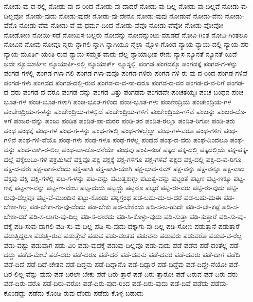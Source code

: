 {ನೋಡು-ವು-ದ-ರಲ್ಲಿ
ನೋಡು-ವು-ದ-ರಿಂದ
ನೋಡು-ವು-ದಾದರೆ
ನೋಡು-ವು-ದಿಲ್ಲ
ನೋಡು-ವು-ದಿಲ್ಲವೆ
ನೋಡು-ವು-ದಿಲ್ಲವೋ
ನೋಡು-ವುದು
ನೋಡು-ವುದೇ
ನೋಡು-ವು-ದೇನೊ
ನೋಡು-ವುವು
ನೋಡುವೆ
ನೋಡು-ವೆನು
ನೋಡು-ವೆನೊ
ನೋಡು-ವೆವು
ನೋಡು-ವೆ-ವು-ಧರ್ಮ-ದಿಂದ
ನೋಡು-ವೆವೊ
ನೋಡು-ವೆವೋ
ನೋಡು-ವೋವೋ
ನೋಡೋಣ
ನೋಯಿ-ಸದೆ
ನೋಯಿಸ-ಬಲ್ಲರು
ನೋವನ್ನು
ನೋವನ್ನುಂಟು-ಮಾಡದೆ
ನೋವಿ-ಗಿಂತ
ನೋವಿ-ಗಿಂತಲೂ
ನೋವಿನ
ನೋವು
ನೋವೂ
ನ್ನರು
ನ್ನಾಗಲಿ
ನ್ನಾಗಿ
ನ್ನಾಗಿಯೂ
ನ್ನೆಲ್ಲಾ
ನ್ನೊಳ-ಗೊಂಡ
ನ್ಯಾಯ
ನ್ಯಾಯ-ದಲ್ಲಿ
ನ್ಯಾಯ-ಪರ
ನ್ಯಾಯ-ಮೂರ್ತಿ-ಯಂತಿ-ರುವ
ನ್ಯಾಯ-ಸಮ್ಮತ-ವಾದು-ದೆಲ್ಲ
ನ್ಯಾಯಾಧೀಶ-ರೇನು
ನ್ಯಾಸ
ನ್ಯೂನತೆ
ನ್ಯೂನತೆ-ಯಿದೆ-ಅದೇ
ನ್ಯೂಯಾರ್ಕಿನ
ನ್ಯೂಯಾರ್ಕಿ-ನಲ್ಲಿ
ನ್ಯೂಯಾರ್ಕ್
ನ್ಯೂಸ್ನಲ್ಲಿ
ಪಂಗಡ
ಪಂಗಡಕ್ಕೂ
ಪಂಗಡಕ್ಕೆ
ಪಂಗಡ-ಗ-ಳನ್ನು
ಪಂಗಡ-ಗಳಲ್ಲಿ
ಪಂಗಡ-ಗಳಾ-ಗಲಿ
ಪಂಗಡ-ಗಳಾ-ವುವೂ
ಪಂಗಡ-ಗಳಿರು
ಪಂಗಡ-ಗಳಿ-ರು-ವು-ದ-ರಿಂದ
ಪಂಗಡ-ಗಳಿವೆ
ಪಂಗಡ-ಗಳು
ಪಂಗಡದ
ಪಂಗಡ-ದಲ್ಲಿ-ರುವ
ಪಂಗಡ-ದ-ವ-ನಾ-ದರೂ
ಪಂಗಡ-ದ-ವರ
ಪಂಗಡ-ದ-ವ-ರಿಗೆ
ಪಂಗಡ-ದ-ವರು
ಪಂಗಡ-ದ-ವರೂ
ಪಂಗಡ-ವನ್ನು
ಪಂಗಡ-ವಿತ್ತು
ಪಂಗಡವು
ಪಂಗಡವೇ
ಪಂಚತಯ್ಯಃ
ಪಂಚ-ಬಂಧನ
ಪಂಚ-ಭೂತ-ಗಳ
ಪಂಚ-ಭೂತ-ಗಳಾಗಿ
ಪಂಚ-ಭೂತ-ಗಳಿಂದ
ಪಂಚ-ಭೂತ-ಗಳು
ಪಂಚೇಂದ್ರಿಯ
ಪಂಚೇಂದ್ರಿಯ-ಗಳ
ಪಂಚೇಂದ್ರಿಯ-ಗ-ಳನ್ನು
ಪಂಚೇಂದ್ರಿಯ-ಗಳಲ್ಲಿದೆ
ಪಂಚೇಂದ್ರಿಯ-ಗಳಿಗೆ
ಪಂಚೇಂದ್ರಿಯ-ಗಳಿವೆ
ಪಂಜನ್ನು
ಪಂಜರ-ದೊ-ಳಗೆ
ಪಂಜರ-ವನ್ನು
ಪಂಜು
ಪಂಡಿತ
ಪಂಡಿತ-ಪಾ-ಮರರ
ಪಂಡಿ-ತರ
ಪಂಡಿತ-ರಲ್ಲೂ
ಪಂಡಿತ-ರಿಗೋ
ಪಂಡಿ-ತರು
ಪಂಥ
ಪಂಥಕ್ಕೆ
ಪಂಥ-ಗಳ
ಪಂಥ-ಗ-ಳನ್ನು
ಪಂಥ-ಗಳಲ್ಲಿ
ಪಂಥ-ಗಳಲ್ಲೆಲ್ಲಾ
ಪಂಥ-ಗಳ-ವರೂ
ಪಂಥ-ಗಳಿಗೆ
ಪಂಥ-ಗಳಿವೆ
ಪಂಥ-ಗಳಿ-ವೆಯೊ
ಪಂಥ-ಗಳು
ಪಂಥ-ಗಳೂ
ಪಂಥ-ಗಳೆಲ್ಲ
ಪಂಥದ
ಪಂಥ-ದ-ವರು
ಪಂಥ-ದಿಂದಲೂ
ಪಂಥ-ವನ್ನು
ಪಂಥ-ವಾಗಿ-ರ-ಲಿಲ್ಲ
ಪಂಥ-ವಾ-ದೊ-ಡನೆಯೇ
ಪಂಥವು
ಪಂಪಿ-ನಂತೆ
ಪಕ್ಕದ
ಪಕ್ಕ-ದಲ್ಲಿ
ಪಕ್ಕದಲ್ಲಿಯೆ
ಪಕ್ಕ-ಪಕ್ಕ-ದಲ್ಲೆ
ಪಕ್ಕೆಲುಬು-ಗಳ
ಪಕ್ರಮಿಸಿದೆ
ಪಕ್ವವೂ
ಪಕ್ಷ
ಪಕ್ಷಕ್ಕೆ
ಪಕ್ಷ-ಗಳಿಗೂ
ಪಕ್ಷ-ಗಳಿವೆ
ಪಕ್ಷದ
ಪಕ್ಷ-ದಲ್ಲಿ
ಪಕ್ಷ-ದ-ವ-ರಿಗೂ
ಪಕ್ಷ-ದ-ವರು
ಪಕ್ಷ-ಪಾತ-ವೆಂದು
ಪಕ್ಷ-ಪಾತಿ
ಪಕ್ಷ-ಪಾತಿ-ಯಾಗಿ
ಪಕ್ಷ-ಭಾವ-ನಮ್
ಪಕ್ಷ-ವನ್ನು
ಪಕ್ಷ-ವನ್ನೂ
ಪಕ್ಷ-ವಾದ
ಪಕ್ಷವು
ಪಕ್ಷಿ
ಪಕ್ಷಿ-ಗಳಲ್ಲಿ
ಪಟ-ಗ-ಳನ್ನು
ಪಟ-ವನ್ನು
ಪಟುತ್ವಕುಗ್ಗು
ಪಟುತ್ವ-ವನ್ನು
ಪಟ್ಟಂತೆ
ಪಟ್ಟಣ
ಪಟ್ಟ-ಣಕ್ಕೂ
ಪಟ್ಟ-ಣಕ್ಕೆ
ಪಟ್ಟ-ಣ-ವನ್ನು
ಪಟ್ಟ-ಣ-ವೆಂಬ
ಪಟ್ಟ-ದುದು
ಪಟ್ಟದ್ದು
ಪಟ್ಟರೂ
ಪಟ್ಟರೆ
ಪಟ್ಟಿ-ರು-ವರು
ಪಟ್ಟಿ-ರು-ವುದು
ಪಟ್ಟಿ-ರುವು-ದೆಲ್ಲವೂ
ಪಟ್ಟಿ-ವೆ-ಮುಂದಿನ
ಪಟ್ಟು-ಕೊಂಡು
ಪಠ್ಯಗ್ರಂಥ
ಪಡ-ಬಹು-ದು-ಆ-ದರೆ
ಪಡ-ಬಹು-ದುಈ
ಪಡ-ಬೇಕಾ-ಗಿಲ್ಲ
ಪಡ-ಬೇಕಾ-ಗು-ವು-ದೆಂದು
ಪಡ-ಬೇಕು
ಪಡ-ಬೇಕೆಂದು
ಪಡಿ-ಸ-ಬ-ಹುದೇ
ಪಡಿ-ಸ-ಬೇ-ಕಷ್ಟೆ
ಪಡಿ-ಸ-ಬೇಕಾ-ದರೆ
ಪಡಿ-ಸ-ಲಾಗು-ವು-ದಿಲ್ಲ
ಪಡಿ-ಸ-ಲಾರದು
ಪಡಿ-ಸಿ-ಕೊಳ್ಳು-ವುದು
ಪಡಿ-ಸುತ್ತಾ
ಪಡಿ-ಸುತ್ತಾರೆ
ಪಡಿ-ಸು-ವು-ದಕ್ಕೆ
ಪಡಿ-ಸುವು-ದಾಗಲಿ
ಪಡಿ-ಸು-ವು-ದಿಲ್ಲ
ಪಡಿ-ಸು-ವುದು-ದಕ್ಕಾಗು-ವು-ದಿಲ್ಲ
ಪಡಿ-ಸೋಣ
ಪಡುತ್ತಾನೆ
ಪಡುತ್ತಾರೆ
ಪಡುತ್ತಿದ್ದರೂ
ಪಡುತ್ತಿ-ರುವ
ಪಡುತ್ತೇವೆ
ಪಡುವ
ಪಡು-ವಂತಹ
ಪಡುವನು
ಪಡುವರು
ಪಡುವರೊ
ಪಡುವ-ವ-ರೆಲ್ಲ
ಪಡು-ವಷ್ಟು
ಪಡುವಾಗ
ಪಡು-ವಿರಿ
ಪಡು-ವುದಕ್ಕೆ
ಪಡುವು-ದಿಲ್ಲವೊ
ಪಡು-ವುದು
ಪಡೆ
ಪಡೆದ
ಪಡೆ-ದಂತೆಲ್ಲ
ಪಡೆ-ದದ್ದು
ಪಡೆದ-ಮೇಲೆ
ಪಡೆ-ದರು
ಪಡೆ-ದರೂ
ಪಡೆ-ದರೆ
ಪಡೆ-ದವನು
ಪಡೆ-ದವರ
ಪಡೆ-ದವರು
ಪಡೆ-ದಾಗ
ಪಡೆದಿ
ಪಡೆ-ದಿದೆ
ಪಡೆ-ದಿದೆ-ಚೇತನ
ಪಡೆ-ದಿದ್ದನು
ಪಡೆ-ದಿದ್ದಾನೊ
ಪಡೆ-ದಿದ್ದಾರೆ
ಪಡೆ-ದಿದ್ದೆವು
ಪಡೆ-ದಿದ್ದೇ-ನೆಯೋ
ಪಡೆ-ದಿರ-ಲಿಲ್ಲ-ವೆನ್ನು-ವುದು
ಪಡೆ-ದಿರಲೇ-ಬೇಕು
ಪಡೆ-ದಿರು-ತ್ತಾರೆ
ಪಡೆ-ದಿರು-ತ್ತಾರೋ
ಪಡೆ-ದಿರುವ
ಪಡೆ-ದಿರು-ವರು
ಪಡೆ-ದಿರು-ವರೊ
ಪಡೆ-ದಿರು-ವರೋ
ಪಡೆ-ದಿರು-ವುದ-ರಿಂದ
ಪಡೆ-ದಿರು-ವುದು
ಪಡೆ-ದಿವೆ
ಪಡೆದು
ಪಡೆದು-ಕೊಂಡದ್ದು
ಪಡೆದು-ಕೊಂಡಿ-ರುವು-ದೆಂದು
ಪಡೆದು-ಕೊಳ್ಳ-ಬಹುದು
}
